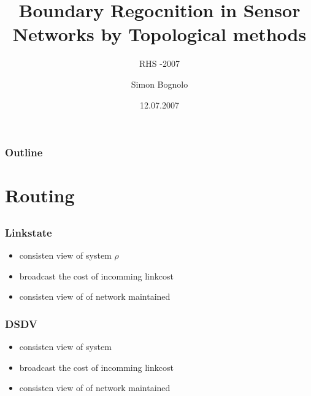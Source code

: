 \documentclass{beamer}
\title
{Boundary Regocnition in Sensor Networks by Topological methods}
\subtitle
{RHS -2007}
\author
{Simon Bognolo}
\date
{12.07.2007}
\begin{document}
\begin{frame}
  \titlepage
\end{frame}

\begin{frame}
  \frametitle{Outline}
  \tableofcontents
\end{frame}

\section{Routing}

\subsection[Proactive]{}
\begin{frame}
  \frametitle{Linkstate}
  \begin{itemize}
  	\item consisten view of system $\rho$
    \item broadcast the cost of incomming linkcost 
    \item consisten view of of network maintained
  \end{itemize}
\end{frame}

\begin{frame}
  \frametitle{DSDV}
  \begin{itemize}
  	\item consisten view of system
    \item broadcast the cost of incomming linkcost 
    \item consisten view of of network maintained
  \end{itemize}
\end{frame}
\end{document}
